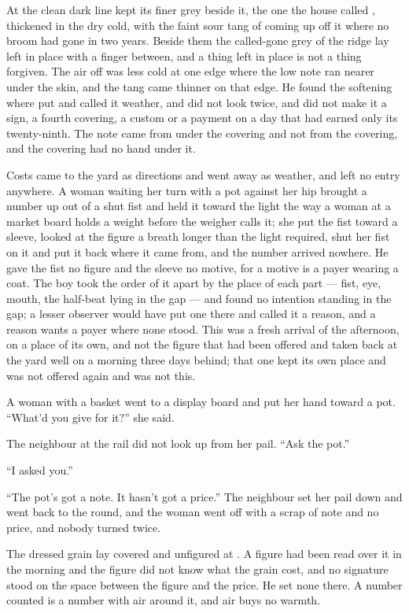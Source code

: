 At  the clean dark line kept its finer grey beside it, the one the house called , thickened in the dry cold, with the faint sour tang of  coming up off it where no broom had gone in two years. Beside them the called-gone grey of the ridge lay left in place with a finger between, and a thing left in place is not a thing forgiven. The air off  was less cold at one edge where the low note ran nearer under the skin, and the tang came thinner on that edge. He found the softening where put and called it weather, and did not look twice, and did not make it a sign, a fourth covering, a custom or a payment on a day that had earned only its twenty-ninth. The note came from under the covering and not from the covering, and the covering had no hand under it.

\scenebreak

Costs came to the yard as directions and went away as weather, and left no entry anywhere. A woman waiting her turn with a pot against her hip brought a number up out of a shut fist and held it toward the light the way a woman at a market board holds a weight before the weigher calls it; she put the fist toward a sleeve, looked at the figure a breath longer than the light required, shut her fist on it and put it back where it came from, and the number arrived nowhere. He gave the fist no figure and the sleeve no motive, for a motive is a payer wearing a coat. The boy took the order of it apart by the place of each part --- fist, eye, mouth, the half-beat lying in the gap --- and found no intention standing in the gap; a lesser observer would have put one there and called it a reason, and a reason wants a payer where none stood. This was a fresh arrival of the afternoon, on a place of its own, and not the figure that had been offered and taken back at the yard well on a morning three days behind; that one kept its own place and was not offered again and was not this.

A woman with a basket went to a display board and put her hand toward a pot. “What'd you give for it?” she said.

The neighbour at the rail did not look up from her pail. “Ask the pot.”

“I asked you.”

“The pot's got a note. It hasn't got a price.” The neighbour set her pail down and went back to the round, and the woman went off with a scrap of note and no price, and nobody turned twice.

The dressed grain lay covered and unfigured at . A figure had been read over it in the morning and the figure did not know what the grain cost, and no signature stood on the space between the figure and the price. He set none there. A number counted is a number with air around it, and air buys no warmth.

